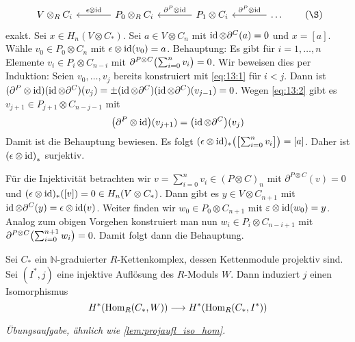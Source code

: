 \begin{beweis}
\begin{equation}
\begin{tikzcd}[sep=large]
			V \otimes_R C_i & P_0 \otimes_R C_i \lar["\epsilon \otimes \id"'] & P_1 \otimes C_i \lar["\partial^P \otimes \id"'] & \ldots \lar["\partial^P \otimes \id"']
		\end{tikzcd}
		\label{eq:13:2}\tag{\S}
	\end{equation}
	exakt.
	Sei $x \in H_n(V \otimes C_*)$.
	Sei $a \in V \otimes C_n$ mit $\id \otimes \partial^C(a)=0$ und $x=[a]$.
	Wähle $v_0 \in P_0 \otimes C_n$ mit $\epsilon \otimes \id(v_0)=a$.
	Behauptung: Es gibt für $i=1,\ldots ,n$ Elemente $v_i \in P_i \otimes C_{n-i}$ mit 
	\(
		\partial^{P \otimes C} \enbrace[\big]{\sum_{i=0}^{n} v_i } = 0
	\).
	Wir beweisen dies per Induktion: Seien $v_0, \ldots ,v_j$ bereits konstruiert mit \eqref{eq:13:1} für $i<j$.
	Dann ist $(\partial^P \otimes \id)(\id \otimes \partial^C)(v_j) = \pm (\id \otimes \partial^C) (\id \otimes \partial^C)(v_{j-1})=0$.
	Wegen \eqref{eq:13:2} gibt es $v_{j+1} \in P_{j+1} \otimes C_{n-j-1}$ mit 
	\[
		\enbrace*{\partial^P \otimes \id}(v_{j+1}) = \enbrace*{\id \otimes \partial^C}(v_j)
	\]
	Damit ist die Behauptung bewiesen.
	Es folgt $(\epsilon \otimes \id)_* \enbrace*{\benbrace[\big]{\sum_{i=0}^n v_i}} = [a]$.
	Daher ist $\enbrace*{\epsilon \otimes \id}_*$ surjektiv. 
	
	Für die Injektivität betrachten wir $v= \sum_{i=0}^{n} v_i \in (P \otimes C)_n$ mit $\partial^{P \otimes C}(v)=0$ und $(\epsilon \otimes \id)_* ([v])=0 \in H_n(V \otimes C_*)$.
	Dann gibt es $y \in V \otimes C_{n+1}$ mit $\id \otimes \partial^C(y)=\epsilon \otimes \id(v)$.
	Weiter finden wir $w_0 \in P_0 \otimes C_{n+1}$ mit $\varepsilon \otimes \id(w_0)=y$.
	Analog zum obigen Vorgehen konstruiert man nun $w_i \in P_i \otimes C_{n-i+1}$ mit $\partial^{P \otimes C} \enbrace[\big]{\sum_{i=0}^{n+1} w_i }=0$.
	Damit folgt dann die Behauptung.
\end{beweis}

\begin{lemma}[{name=[{Hom mit injektiver Auflösung des Zielmoduls}]}]
	Sei $C_*$ ein $\mathbb{N}$-graduierter $R$-Kettenkomplex, dessen Kettenmodule projektiv sind.
	Sei $(I^*,j)$ eine injektive Auflösung des $R$-Moduls $W$.
	Dann induziert $j$ einen Isomorphismus 
	\[
		H^*\enbrace*{\Hom_R(C_*,W)} \longrightarrow H^* \enbrace*{\Hom_R(C_*,I^*)}
	\]
\end{lemma}
\begin{beweis}
	\emph{Übungsaufgabe, ähnlich wie \autoref{lem:projaufl_iso_hom}.}
\end{beweis}


